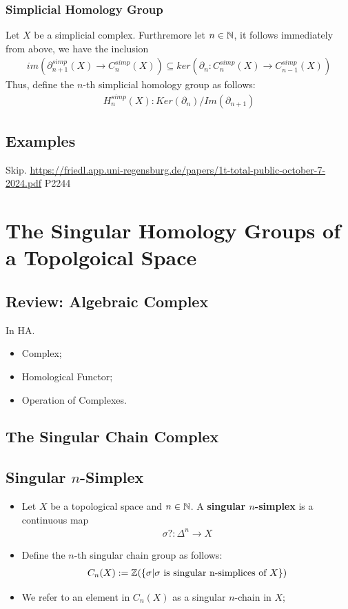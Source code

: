 \documentclass[Total.tex]{subfiles}
\begin{document}
			\subsubsection{Simplicial Homology Group}
			\begin{Def}
				Let $X$ be a simplicial complex. Furthremore let $n\in \mathbb{N}$, it follows immediately from above, we have the inclusion
				\begin{gather*}
					im(\partial_{n+1}^{simp}(X)\rightarrow C_n^{simp}(X))\subseteq ker(\partial_n:C_n^{simp}(X)\rightarrow C_{n-1}^{simp}(X))
				\end{gather*}
				Thus, define the $n$-th simplicial homology group as follows:
				\begin{gather*}
					H^{simp}_n(X):Ker(\partial_n)/Im(\partial_{n+1})
				\end{gather*}
			\end{Def}
			\subsection{Examples}
			
			Skip. \url{https://friedl.app.uni-regensburg.de/papers/1t-total-public-october-7-2024.pdf} P2244
		\section{The Singular Homology Groups of a Topolgoical Space}
			\subsection{Review: Algebraic Complex}
				In HA.
				\begin{itemize}
					\item Complex;
					\item Homological Functor;
					\item Operation of Complexes.
				\end{itemize}
			\subsection{The Singular Chain Complex}
				
			\subsection{Singular $n$-Simplex}
			\begin{Def}
				\begin{itemize}
					\item Let $X$ be a topological space and $n\in \mathbb{N}$. A \textbf{singular $n$-simplex} is a continuous map
					\begin{gather*}
						\sigma?:\Delta^n\rightarrow X
					\end{gather*}
					\item Define the $n$-th singular chain group as follows:
					\begin{gather*}
						C_n(X):=\mathbb{Z}(\{\sigma|\sigma\mbox{ is singular n-simplices of }X\})
					\end{gather*}
					\item We refer to an element in $C_n(X)$ as a singular $n$-chain in $X$;
				\end{itemize}
			\end{Def}
\end{document}
